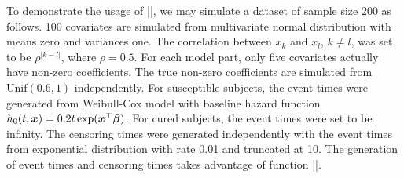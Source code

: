 To demonstrate the usage of
\VERB|\NormalTok{()}|, we may simulate a
dataset of sample size 200 as follows. 100 covariates are simulated from
multivariate normal distribution with means zero and variances one. The
correlation between \(x_k\) and \(x_l\), \(k\neq l\), was set to be
\(\rho^{\lvert k - l \rvert}\), where \(\rho = 0.5\). For each model
part, only five covariates actually have non-zero coefficients. The true
non-zero coefficients are simulated from \(\mathrm{Unif}(0.6, 1)\)
independently. For susceptible subjects, the event times were generated
from Weibull-Cox model with baseline hazard function
\(h_0(t; \bm{x}) = 0.2t\exp(\bm{x}^{\top}\bm{\beta})\). For cured subjects, the event
times were set to be infinity. The censoring times were generated
independently with the event times from exponential distribution with
rate 0.01 and truncated at 10. The generation of event times and
censoring times takes advantage of function
\VERB|\OperatorTok{::}\NormalTok{()}|.

